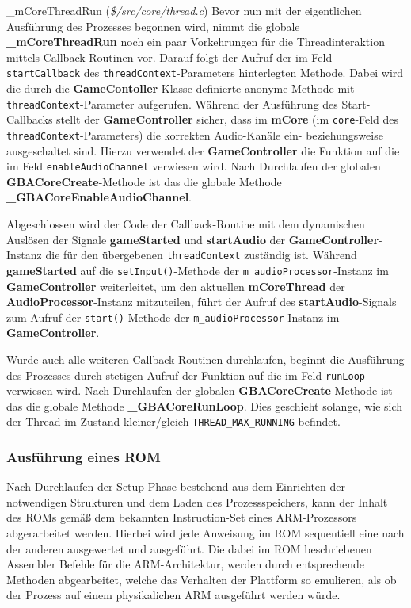 \documentclass[11pt,a4paper]{scrartcl}
\begin{document}
\newpage

\vspace{5mm}
\large {\_}mCoreThreadRun \normalsize(\textit{\$/src/core/thread.c})
\vspace{2mm}\newline
Bevor nun mit der eigentlichen Ausf\"uhrung des Prozesses begonnen wird, nimmt die globale \textbf{{\_}mCoreThreadRun} noch ein paar Vorkehrungen f\"ur die Threadinteraktion mittels Callback-Routinen vor. Darauf folgt der Aufruf der im Feld \verb|startCallback| des \verb|threadContext|-Parameters hinterlegten Methode. Dabei wird die durch die \textbf{GameContoller}-Klasse definierte anonyme Methode mit \verb|threadContext|-Parameter aufgerufen. W\"ahrend der Ausf\"uhrung des Start-Callbacks stellt der \textbf{GameController} sicher, dass im \textbf{mCore} (im \verb|core|-Feld des \verb|threadContext|-Parameters) die korrekten Audio-Kan\"ale ein- beziehungsweise ausgeschaltet sind. Hierzu verwendet der \textbf{GameController} die Funktion auf die im Feld \verb|enableAudioChannel| verwiesen wird. Nach Durchlaufen der globalen \textbf{GBACoreCreate}-Methode ist das die globale Methode \textbf{{\_}GBACoreEnableAudioChannel}.

Abgeschlossen wird der Code der Callback-Routine mit dem dynamischen Ausl\"osen der Signale \textbf{gameStarted} und \textbf{startAudio} der \textbf{GameController}-Instanz die f\"ur den \"ubergebenen \verb|threadContext| zust\"andig ist. W\"ahrend \textbf{gameStarted} auf die \verb|setInput()|-Methode der \verb|m_audioProcessor|-Instanz im \textbf{GameController} weiterleitet, um den aktuellen \textbf{mCoreThread} der \textbf{AudioProcessor}-Instanz mitzuteilen, f\"uhrt der Aufruf des \textbf{startAudio}-Signals zum Aufruf der \verb|start()|-Methode der \verb|m_audioProcessor|-Instanz im \textbf{GameController}.

Wurde auch alle weiteren Callback-Routinen durchlaufen, beginnt die Ausf\"uhrung des Prozesses durch stetigen Aufruf der Funktion auf die im Feld \verb|runLoop| verwiesen wird. Nach Durchlaufen der globalen \textbf{GBACoreCreate}-Methode ist das die globale Methode \textbf{{\_}GBACoreRunLoop}. Dies geschieht solange, wie sich der Thread im Zustand kleiner/gleich \verb|THREAD_MAX_RUNNING| befindet.


\subsubsection{Ausf\"uhrung eines ROM}

Nach Durchlaufen der Setup-Phase bestehend aus dem Einrichten der notwendigen Strukturen und dem Laden des Prozessspeichers, kann der Inhalt des ROMs gem\"a{\ss} dem bekannten Instruction-Set eines ARM-Prozessors abgerarbeitet werden. Hierbei wird jede Anweisung im ROM sequentiell eine nach der anderen ausgewertet und ausgef\"uhrt. Die dabei im ROM beschriebenen Assembler Befehle f\"ur die ARM-Architektur, werden durch entsprechende Methoden abgearbeitet, welche das Verhalten der Plattform so emulieren, als ob der Prozess auf einem physikalichen ARM ausgef\"uhrt werden w\"urde.
\end{document}
